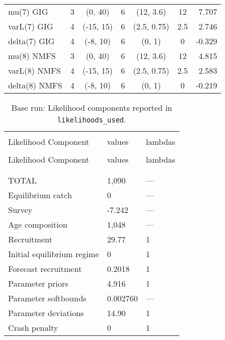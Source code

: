 \begin{table}[!h]
\begin{tabular}{lcccccr}
mu(7) GIG & 3 & (0, 40) & 6 & (12, 3.6) & 12 & 7.707 \\
varL(7) GIG & 4 & (-15, 15) & 6 & (2.5, 0.75) & 2.5 & 2.746 \\
delta(7) GIG & 4 & (-8, 10) & 6 & (0, 1) & 0 & -0.329 \\
mu(8) NMFS & 3 & (0, 40) & 6 & (12, 3.6) & 12 & 4.815 \\
varL(8) NMFS & 4 & (-15, 15) & 6 & (2.5, 0.75) & 2.5 & 2.583 \\
delta(8) NMFS & 4 & (-8, 10) & 6 & (0, 1) & 0 & -0.219 \\
\hline
\end{tabular}
\usefont{\encodingdefault}{\familydefault}{\seriesdefault}{\shapedefault}\normalsize
\end{table}

\clearpage

\setlength{\tabcolsep}{0pt}
\begin{longtable}[c]{>{\raggedright\let\newline\\\arraybackslash\hspace{0pt}}p{2.31in}>{\raggedleft\let\newline\\\arraybackslash\hspace{0pt}}p{1.35in}>{\raggedleft\let\newline\\\arraybackslash\hspace{0pt}}p{1.35in}}
  \caption{Base run: Likelihood components reported in \texttt{likelihoods\_used}.} \label{tab:pop.like1}\\  \hline\\[-2.2ex]  
  Likelihood Component  & values & lambdas \\[0.2ex]\hline\\[-1.5ex]  \endfirsthead   \hline  
  Likelihood Component  & values & lambdas \\[0.2ex]\hline\\[-1.5ex]  \endhead  \hline\\[-2.2ex]   \endfoot  \hline \endlastfoot
  TOTAL & 1,090 & --- \\ 
  Equilibrium catch & 0 & --- \\ 
  Survey & -7.242 & --- \\ 
  Age composition & 1,048 & --- \\ 
  Recruitment & 29.77 & 1 \\ 
  Initial equilibrium regime & 0 & 1 \\ 
  Forecast recruitment & 0.2018 & 1 \\ 
  Parameter priors & 4.916 & 1 \\ 
  Parameter softbounds & 0.002760 & --- \\ 
  Parameter deviations & 14.90 & 1 \\ 
  Crash penalty & 0 & 1 \\ 
\end{longtable}\setlength{\tabcolsep}{0pt}

